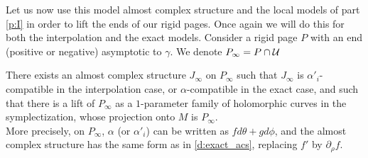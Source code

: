 \documentclass[../main.tex]{subfiles}
\begin{document}
Let us now use this model almost complex structure and the local models of part \ref{p:I} in order to lift the ends of our rigid pages. Once again we will do this for both the interpolation and the exact models. Consider a rigid page $P$ with an end (positive or negative) asymptotic to $\gamma$. We denote $P_\infty = P\cap \mathcal{U}$

\begin{lemma}\label{l:lift_ends}
There exists an almost complex structure $J_\infty$ on $P_\infty$ such that $J_\infty$ is $\alpha'_i$-compatible in the interpolation case, or $\alpha$-compatible in the exact case, and such that there is a lift of $P_\infty$ as a $1$-parameter family of holomorphic curves in the symplectization, whose projection onto $M$ is $P_\infty$. \\
More precisely, on $P_\infty$, $\alpha$ (or $\alpha'_i$) can be written as $fd\theta + gd\phi$, and the almost complex structure has the same form as in \ref{d:exact_acs}, replacing $f'$ by $\partial_\rho f$.
\end{lemma}
\end{document}
